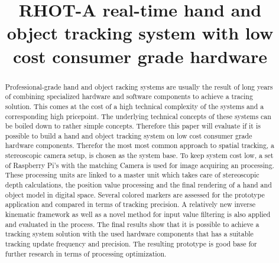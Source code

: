 \documentclass[10pt,twocolumn]{report}
\begin{document}
\title{RHOT-A real-time hand and object tracking
system with low cost consumer grade
hardware} %
\maketitle
\begin{abstract}
Professional-grade hand and object racking systems are usually the result of long years of combining specialized hardware and software components to achieve a tracing solution. This comes at the cost of a high technical complexity of the systems and a corresponding high pricepoint. The underlying technical concepts of these systems can be boiled down to rather simple concepts. Therefore this paper will evaluate if it is possible to build a hand and object tracking system on low cost consumer grade hardware components. Therefor the most most common approach to spatial tracking, a stereoscopic camera setup, is chosen as the system base. To keep system cost low, a set of Raspberry Pi's with the matching Camera is used for image acquiring an processing. These processing units are linked to a master unit which takes care of stereoscopic depth calculations, the position value processing and the final rendering of a hand and object model in digital space. Several colored markers are assessed for the prototype application and compared in terms of tracking precision. A relatively new inverse kinematic framework as well as a novel method for input value filtering is also applied  and evaluated in the process.
The final results show that it is possible to achieve a tracking system solution with the used hardware components that has a suitable tracking update frequency and precision. The resulting prototype is good base for further research in terms of processing optimization.
\end{abstract}



%





\newpage
%
%
\end{document}
